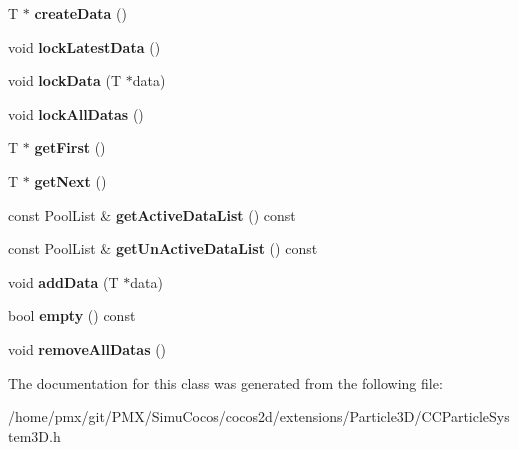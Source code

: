 \begin{DoxyCompactItemize}
\item 
\mbox{\label{classDataPool_a737acdb580cdb34ea8a59f76e094b490}} 
T $\ast$ {\bfseries create\+Data} ()
\item 
\mbox{\label{classDataPool_a2bd98736cebb5674f994ff04e70f908e}} 
void {\bfseries lock\+Latest\+Data} ()
\item 
\mbox{\label{classDataPool_ac508d992311e1302a3fe32ae9f3ae148}} 
void {\bfseries lock\+Data} (T $\ast$data)
\item 
\mbox{\label{classDataPool_acf14f62428a0ea0489732aef4d5fda9f}} 
void {\bfseries lock\+All\+Datas} ()
\item 
\mbox{\label{classDataPool_a85ffc7c859d87a285a6aa8742a864bd6}} 
T $\ast$ {\bfseries get\+First} ()
\item 
\mbox{\label{classDataPool_a629892c97006f0e415d6f13e052aadb7}} 
T $\ast$ {\bfseries get\+Next} ()
\item 
\mbox{\label{classDataPool_a352b216c91d7689b7a294d4071e815b8}} 
const Pool\+List \& {\bfseries get\+Active\+Data\+List} () const
\item 
\mbox{\label{classDataPool_ac4aa7bb314d777a1a180a4bf296d3545}} 
const Pool\+List \& {\bfseries get\+Un\+Active\+Data\+List} () const
\item 
\mbox{\label{classDataPool_aa59be4aff07116e60e4dff289e799562}} 
void {\bfseries add\+Data} (T $\ast$data)
\item 
\mbox{\label{classDataPool_a3ffa15675f08636bc320b5dbc1617f7c}} 
bool {\bfseries empty} () const
\item 
\mbox{\label{classDataPool_ae485b84a5b8a57d960948af4d0507d05}} 
void {\bfseries remove\+All\+Datas} ()
\end{DoxyCompactItemize}


The documentation for this class was generated from the following file\+:\begin{DoxyCompactItemize}
\item 
/home/pmx/git/\+P\+M\+X/\+Simu\+Cocos/cocos2d/extensions/\+Particle3\+D/C\+C\+Particle\+System3\+D.\+h\end{DoxyCompactItemize}
